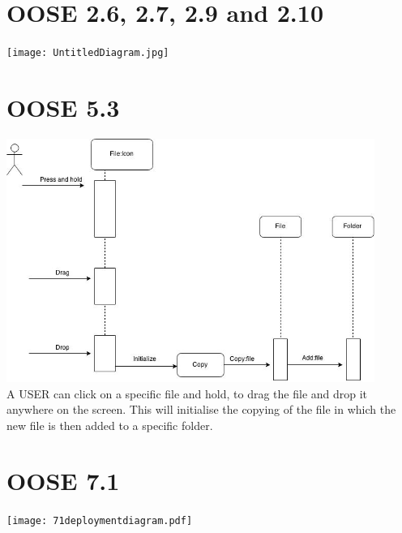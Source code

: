 \documentclass[12pt,a4paper]{article}
\begin{document}
\newpage

\section{OOSE 2.6, 2.7, 2.9 and 2.10}
\texttt{[image: UntitledDiagram.jpg]}

\newpage

\section{OOSE 5.3}
\includegraphics[height=300px]{Sequence.jpg}\\
A USER can click on a specific file and hold, to drag the file and drop it anywhere on the screen. This will initialise the copying of the file in which the new file is then added to a specific folder.

\newpage

\section{OOSE 7.1}
\texttt{[image: 71deploymentdiagram.pdf]}
\end{document}

